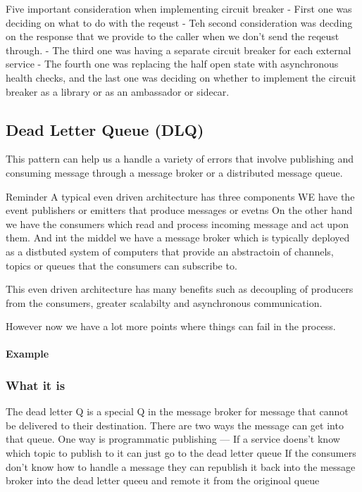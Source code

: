 \documentclass[a4paper, 11pt]{book}
\begin{document}
{    Five important consideration when implementing circuit breaker
    - First one was deciding on what to do with the reqeust
    - Teh second consideration was decding on the response that we provide to the caller when we don't send the reqeust through.
    - The third one was having a separate circuit breaker for each external service
    - The fourth one was replacing the half open state with asynchronous health checks, and the last one was deciding on whether to implement the circuit breaker as a library or as an ambassador or sidecar.

    \subsection{Dead Letter Queue (DLQ)}

    This pattern can help us a handle a variety of errors that involve publishing and consuming message through a message broker or a distributed message queue.

    Reminder
    A typical even driven architecture has three components
    WE have the event publishers or emitters that produce messages or evetns
    On the other hand we have the consumers which read and process incoming message and act upon them.
    And int the middel we have a message broker which is typically deployed as a distbuted system of computers that provide an abstractoin of channels, topics or queues that the consumers can subscribe to.

    This even driven architecture has many benefits such as decoupling of producers from the consumers, greater scalabilty and asynchronous communication.

    However now we have a lot more points where things can fail in the process.

    \paragraph{Example}

    \subsubsection{What it is}
    The dead letter Q is a special Q in the message broker for message that cannot be delivered to their destination.
    There are two ways the message can get into that queue.
    One way is programmatic publishing
    --- If a service doens't know which topic to publish to it can just go to the dead letter queue
    If the consumers don't know how to handle a message they can republish it back into the message broker into the dead letter queeu and remote it from the originoal queue

}
\end{document}
